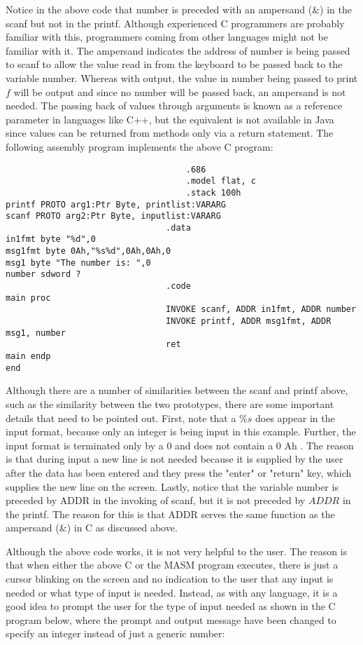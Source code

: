 \documentclass[10pt]{article}
\begin{document}
Notice in the above code that number is preceded with an ampersand (\&) in the scanf but not in the printf. Although experienced C programmers are probably familiar with this, programmers coming from other languages might not be familiar with it. The ampersand indicates the address of number is being passed to scanf to allow the value read in from the keyboard to be passed back to the variable number. Whereas with output, the value in number being passed to print $f$ will be output and since no number will be passed back, an ampersand is not needed. The passing back of values through arguments is known as a reference parameter in languages like C++, but the equivalent is not available in Java since values can be returned from methods only via a return statement. The following assembly program implements the above C program:

\begin{verbatim}
                                    .686
                                    .model flat, c
                                    .stack 100h
printf PROTO arg1:Ptr Byte, printlist:VARARG
scanf PROTO arg2:Ptr Byte, inputlist:VARARG
                                .data
in1fmt byte "%d",0
msg1fmt byte 0Ah,"%s%d",0Ah,0Ah,0
msg1 byte "The number is: ",0
number sdword ?
                                .code
main proc
                                INVOKE scanf, ADDR in1fmt, ADDR number
                                INVOKE printf, ADDR msg1fmt, ADDR msg1, number
                                ret
main endp
end
\end{verbatim}

Although there are a number of similarities between the scanf and printf above, such as the similarity between the two prototypes, there are some important details that need to be pointed out. First, note that a $\% s$ does appear in the input format, because only an integer is being input in this example. Further, the input format is terminated only by a 0 and does not contain a 0 Ah . The reason is that during input a new line is not needed because it is supplied by the user after the data has been entered and they press the "enter" or "return" key, which supplies the new line on the screen. Lastly, notice that the variable number is preceded by ADDR in the invoking of scanf, but it is not preceded by $A D D R$ in the printf. The reason for this is that ADDR serves the same function as the ampersand (\&) in C as discussed above.

Although the above code works, it is not very helpful to the user. The reason is that when either the above C or the MASM program executes, there is just a cursor blinking on the screen and no indication to the user that any input is needed or what type of input is needed. Instead, as with any language, it is a good idea to prompt the user for the type of input needed as shown in the C program below, where the prompt and output message have been changed to specify an integer instead of just a generic number:
\end{document}
